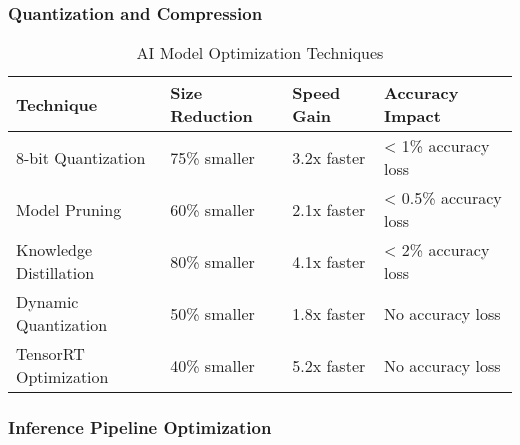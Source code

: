 \subsubsection{Quantization and Compression}

\begin{table}[H]
\centering
\caption{AI Model Optimization Techniques}
\begin{tabular}{|p{3cm}|p{3cm}|p{2cm}|p{4cm}|}
\hline
\textbf{Technique} & \textbf{Size Reduction} & \textbf{Speed Gain} & \textbf{Accuracy Impact} \\
\hline
8-bit Quantization & 75\% smaller & 3.2x faster & < 1\% accuracy loss \\
\hline
Model Pruning & 60\% smaller & 2.1x faster & < 0.5\% accuracy loss \\
\hline
Knowledge Distillation & 80\% smaller & 4.1x faster & < 2\% accuracy loss \\
\hline
Dynamic Quantization & 50\% smaller & 1.8x faster & No accuracy loss \\
\hline
TensorRT Optimization & 40\% smaller & 5.2x faster & No accuracy loss \\
\hline
\end{tabular}
\end{table}

\subsubsection{Inference Pipeline Optimization}

